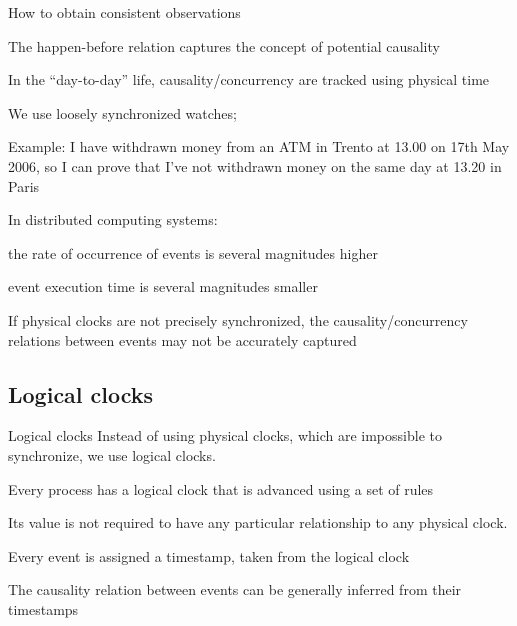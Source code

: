 \begin{frame}{How to obtain consistent observations}

\BIL
\item The happen-before relation captures the concept of potential causality
\item In the ``day-to-day'' life, causality/concurrency are tracked using
  physical time
  \BI
  \item We use loosely synchronized watches;
  \item Example: I have withdrawn money from an ATM in Trento at 13.00 on 17th May 2006,
    so I can prove that I've not withdrawn money on the same day at 13.20 in Paris
  \EI
\item In distributed computing systems:
  \BI
  \item the rate of occurrence of events is several magnitudes higher
  \item event execution time is several magnitudes smaller
  \EI
\item
  If physical clocks are not precisely synchronized, the
  causality/concurrency relations between events may not be accurately captured
\EIL

\end{frame}


\subsection{Logical clocks}

\begin{frame}{Logical clocks}
Instead of using physical clocks, which are impossible to synchronize,
we use logical clocks.
\BI
\item Every process has a \alert{logical clock} that is advanced using a
  set of rules
\item Its value is not required to have any particular relationship to any physical clock.
\item Every event is assigned a timestamp, taken from the logical clock
\item The causality relation between events can be generally inferred
  from their timestamps
\EI
\end{frame}

